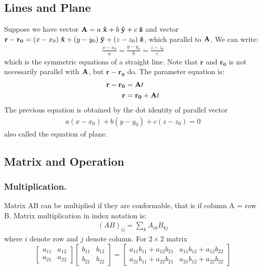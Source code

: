 \documentclass[../main.tex]{subfiles}
\begin{document}
\subsection*{Lines and Plane}
Suppose we have vector $\mathbf{A}=a\;\mathbf{\hat{x}}+b\;\mathbf{\hat{y}} +c\;\mathbf{\hat{z}}$ and vector $\mathbf{r}-\mathbf{r_0}=(x-x_0)\;\mathbf{\hat{x}}+(y-y_0)\;\mathbf{\hat{y}} +(z-z_0)\;\mathbf{\hat{z}}$, which parallel to $\mathbf{A}$.
We can write:
\begin{align*}
	\frac{x-x_0}{a}=\frac{y-y_0}{b}=\frac{z-z_0}{c}
\end{align*}
which is the symmetric equations of a straight line.
Note that $\mathbf{r}$ and $\mathbf{r_0}$ is not necessarily parallel with $\mathbf{A}$, but $\mathbf{r}-\mathbf{r_0}$ do.
The parameter equation is:
\begin{align*}
	\mathbf{r}-\mathbf{r_0} & =\mathbf{A} t              \\
	\mathbf{r}              & =\mathbf{r_0}+\mathbf{A} t
\end{align*}
The previous equation is obtained by the dot identity of parallel vector
\begin{align*}
	a(x-x_0)+b(y-y_0)+c(z-z_0)=0
\end{align*}
also called the equation of plane.

\subsection*{Matrix and Operation}
\subsubsection*{Multiplication.}
Matrix AB can be multiplied if they are conformable, that is if column A = row B.
Matrix multiplication in index notation is:
\begin{align*}
	(AB)_{ij}=\sum_{k}A_{ik}B_{kj}
\end{align*}
where $i$ denote row and $j$ denote column.
For $2\times2$ matrix
\begin{equation*}
	\begin{bmatrix}
		a_{11} & a_{12} \\
		a_{21} & a_{22}
	\end{bmatrix}
	\begin{bmatrix}
		b_{11} & b_{12} \\
		b_{21} & b_{22}
	\end{bmatrix}=
	\begin{bmatrix}
		a_{11}b_{11} + a_{12}b_{21} & a_{11}b_{12} + a_{12}b_{22} \\
		a_{21}b_{11} + a_{22}b_{21} & a_{21}b_{12} + a_{22}b_{22}
	\end{bmatrix}
\end{equation*}
\end{document}
